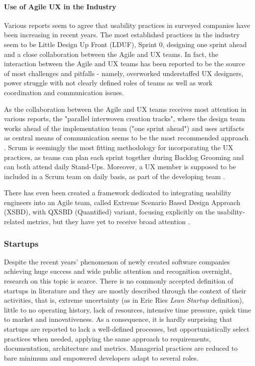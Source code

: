 \documentclass{article}
\begin{document}
\paragraph{Use of Agile UX in the Industry}
Various reports seem to agree that usability practices in surveyed companies have been increasing in recent years. The most established practices in the industry seem to be Little Design Up Front (LDUF), Sprint 0, designing one sprint ahead and a close collaboration between the Agile and UX teams. In fact, the interaction between the Agile and UX teams has been reported to be the source of most challenges and pitfalls - namely, overworked understaffed UX designers, power struggle with not clearly defined roles of teams as well as work coordination and communication issues. \citep{salah2014systematic}\citep{jurca2014integrating}

As the collaboration between the Agile and UX teams receives most attention in various reports, the "parallel interwoven creation tracks", where the design team works ahead of the implementation team ("one sprint ahead") and uses artifacts as central means of communication seems to be the most recommended approach \citep{brhel2015exploring}. Scrum is seemingly the most fitting methodology for incorporating the UX practices, as teams can plan each sprint together during Backlog Grooming and can both attend daily Stand-Ups. Moreover, a UX member is supposed to be included in a Scrum team on daily basis, as part of the developing team \citep{ovad2015prevalence}.

There has even been created a framework dedicated to integrating usability engineers into an Agile team, called Extreme Scenario Based Design Approach (XSBD), with QXSBD (Quantified) variant, focusing explicitly on the usability-related metrics, but they have yet to receive broad attention \citep{jurca2014integrating}.

\subsubsection{Startups}
Despite the recent years' phenomenon of newly created software companies achieving huge success and wide public attention and recognition overnight, research on this topic is scarce. There is no commonly accepted definition of startups in literature and they are mostly described through the context of their activities, that is, extreme uncertainty (as in Eric Ries \textit{Lean Startup} \citep{ries2011lean} definition), little to no operating history, lack of resources, intensive time pressure, quick time to market and innovativeness. As a consequence, it is hardly surprising that startups are reported to lack a well-defined processes, but opportunistically select practices when needed, applying the same approach to requirements, documentation, architecture and metrics. Managerial practices are reduced to bare minimum and empowered developers adapt to several roles. \citep{paternoster2014software}
\end{document}
